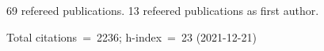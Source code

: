 69 refereed publications. 13 refeered publications as first author.

Total citations~=~2236; h-index~=~23 (2021-12-21)
